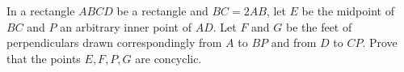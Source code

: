 In a rectangle $ABCD$ be a rectangle and $BC = 2AB$,  let $E$ be the midpoint of $BC$ and $P$ an arbitrary inner point of $AD$. Let $F$ and $G$ be the feet of perpendiculars drawn correspondingly from $A$ to $BP$ and from $D$ to $CP$. Prove that the points $E,F,P,G$ are concyclic.